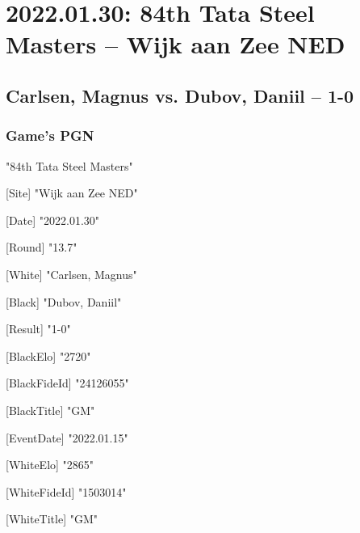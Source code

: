\documentclass[9pt]{extarticle}
\begin{document}
\setlength{\columnsep}{32pt}
\section*{2022.01.30: 84th Tata Steel Masters -- Wijk aan Zee NED}

\subsection*{Carlsen, Magnus vs. Dubov, Daniil -- 1-0}
\subsubsection*{Game's PGN}
\begin{flushleft}
[Event] "84th Tata Steel Masters"

[Site] "Wijk aan Zee NED"

[Date] "2022.01.30"

[Round] "13.7"

[White] "Carlsen, Magnus"

[Black] "Dubov, Daniil"

[Result] "1-0"

[BlackElo] "2720"

[BlackFideId] "24126055"

[BlackTitle] "GM"

[EventDate] "2022.01.15"

[WhiteElo] "2865"

[WhiteFideId] "1503014"

[WhiteTitle] "GM"

\end{flushleft}
\parindent 0mm
\end{document}
